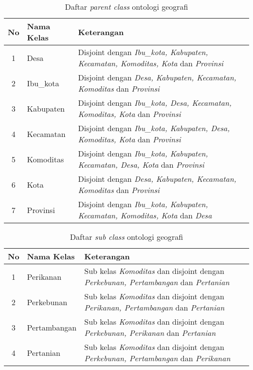 \begin{table}[ht]
	\caption{Daftar \emph{parent class} ontologi geografi}
	\label{table:parent_class_ontogeo}
	\begin{tabularx}{\textwidth}{|c|l|X|}
		\hline
		\textbf{No} & \textbf{Nama Kelas} & \textbf{Keterangan} \\
		\hline
		1 & Desa & Disjoint dengan \emph{Ibu\_kota, Kabupaten, Kecamatan, Komoditas, Kota} dan \emph{Provinsi} \\
		\hline
		2 & Ibu\_kota & Disjoint dengan \emph{Desa, Kabupaten, Kecamatan, Komoditas} dan \emph{Provinsi} \\
		\hline
		3 & Kabupaten & Disjoint dengan \emph{Ibu\_kota, Desa, Kecamatan, Komoditas, Kota} dan \emph{Provinsi} \\
		\hline
		4 & Kecamatan & Disjoint dengan \emph{Ibu\_kota, Kabupaten, Desa, Komoditas, Kota} dan \emph{Provinsi} \\
		\hline
		5 & Komoditas & Disjoint dengan \emph{Ibu\_kota, Kabupaten, Kecamatan, Desa, Kota} dan \emph{Provinsi} \\
		\hline
		6 & Kota & Disjoint dengan \emph{Desa, Kabupaten, Kecamatan, Komoditas} dan \emph{Provinsi} \\
		\hline
		7 & Provinsi & Disjoint dengan \emph{Ibu\_kota, Kabupaten, Kecamatan, Komoditas, Kota} dan \emph{Desa} \\
		\hline
	\end{tabularx}
\end{table}

\begin{table}[ht]
	\caption{Daftar \emph{sub class} ontologi geografi}
	\label{table:sub_class_ontogeo}
	\begin{tabularx}{\textwidth}{|c|l|X|}
		\hline
		\textbf{No} & \textbf{Nama Kelas} & \textbf{Keterangan} \\
		\hline
		1 & Perikanan & Sub kelas \emph{Komoditas} dan disjoint dengan \emph{Perkebunan, Pertambangan} dan \emph{Pertanian}\\
		\hline
		2 & Perkebunan & Sub kelas \emph{Komoditas} dan disjoint dengan \emph{Perikanan, Pertambangan} dan \emph{Pertanian} \\
		\hline
		3 & Pertambangan & Sub kelas \emph{Komoditas} dan disjoint dengan \emph{Perkebunan, Perikanan} dan \emph{Pertanian} \\
		\hline
		4 & Pertanian & Sub kelas \emph{Komoditas} dan disjoint dengan \emph{Perkebunan, Pertambangan} dan \emph{Perikanan} \\
		\hline
	\end{tabularx}
\end{table}

